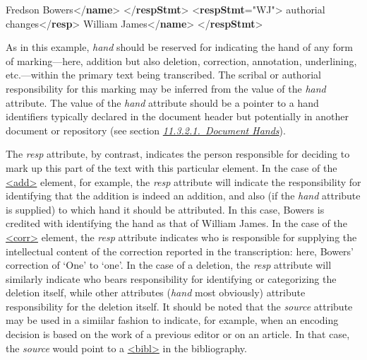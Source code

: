 \begin{shaded}
Fredson Bowers{</\textbf{name}>}\mbox{}\newline 
{</\textbf{respStmt}>}\mbox{}\newline 
{<\textbf{respStmt}\hspace*{1em}{xml:id}="{WJ}">}\mbox{}\newline 
{}authorial changes{</\textbf{resp}>}\mbox{}\newline 
{}William James{</\textbf{name}>}\mbox{}\newline 
{</\textbf{respStmt}>}\end{shaded}\egroup\par \noindent  As in this example, {\itshape hand} should be reserved for indicating the hand of any form of marking—here, addition but also deletion, correction, annotation, underlining, etc.—within the primary text being transcribed. The scribal or authorial responsibility for this marking may be inferred from the value of the {\itshape hand} attribute. The value of the {\itshape hand} attribute should be a pointer to a hand identifiers typically declared in the document header but potentially in another document or repository (see section \textit{\hyperref[PHDH]{11.3.2.1.\ Document Hands}}).\par
The {\itshape resp} attribute, by contrast, indicates the person responsible for deciding to mark up this part of the text with this particular element. In the case of the \hyperref[TEI.add]{<add>} element, for example, the {\itshape resp} attribute will indicate the responsibility for identifying that the addition is indeed an addition, and also (if the {\itshape hand} attribute is supplied) to which hand it should be attributed. In this case, Bowers is credited with identifying the hand as that of William James. In the case of the \hyperref[TEI.corr]{<corr>} element, the {\itshape resp} attribute indicates who is responsible for supplying the intellectual content of the correction reported in the transcription: here, Bowers' correction of ‘One’ to ‘one’. In the case of a deletion, the {\itshape resp} attribute will similarly indicate who bears responsibility for identifying or categorizing the deletion itself, while other attributes ({\itshape hand} most obviously) attribute responsibility for the deletion itself. It should be noted that the {\itshape source} attribute may be used in a simiilar fashion to indicate, for example, when an encoding decision is based on the work of a previous editor or on an article. In that case, the {\itshape source} would point to a \hyperref[TEI.bibl]{<bibl>} in the bibliography.\par
